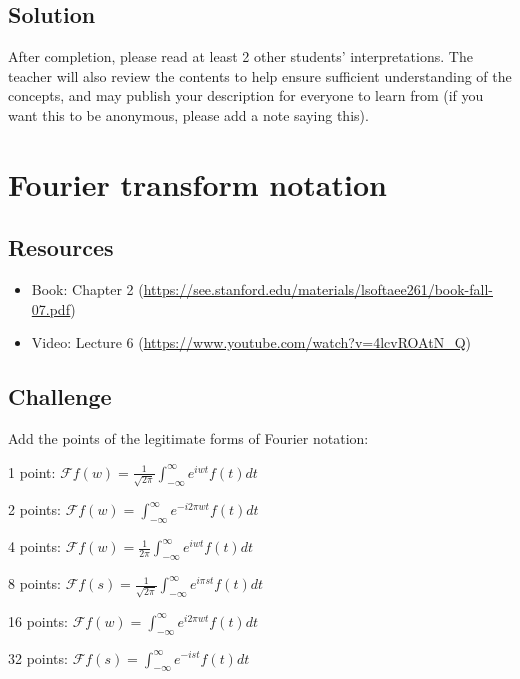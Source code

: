 \subsection*{Solution}
After completion, please read at least 2 other students' interpretations. The teacher will also review the contents to help ensure sufficient understanding of the concepts, and may publish your description for everyone to learn from (if you want this to be anonymous, please add a note saying this).

\timebox




\newpage
\section{Fourier transform notation}

\subsection*{Resources}
\begin{itemize}
    \item Book: Chapter 2 (\url{https://see.stanford.edu/materials/lsoftaee261/book-fall-07.pdf})
    \item Video: Lecture 6 (\url{https://www.youtube.com/watch?v=4lcvROAtN_Q})
\end{itemize}

\subsection*{Challenge}
Add the points of the legitimate forms of Fourier notation:

1 point: $\displaystyle \mathcal{F}f(w)=\frac{1}{\sqrt{2 \pi}} \int_{-\infty}^{\infty} e^{i w t} f(t) dt$

2 points: $\displaystyle \mathcal{F}f(w)=\int_{-\infty}^{\infty} e^{-i 2 \pi w t} f(t) dt$

4 points: $\displaystyle \mathcal{F}f(w)=\frac{1}{2 \pi} \int_{-\infty}^{\infty} e^{i w t} f(t) dt$

8 points: $\displaystyle \mathcal{F}f(s)=\frac{1}{\sqrt{2 \pi}} \int_{-\infty}^{\infty} e^{i \pi s t} f(t) dt$

16 points: $\displaystyle \mathcal{F}f(w)=\int_{-\infty}^{\infty} e^{i 2 \pi w t} f(t) dt$

32 points: $\displaystyle \mathcal{F}f(s)=\int_{-\infty}^{\infty} e^{-i s t} f(t) dt$

